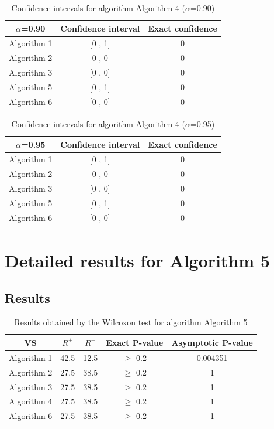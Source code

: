 \documentclass[a4paper,10pt]{article}
\begin{document}
\begin{table}[!htp]
\centering\small
\begin{tabular}{
|c|c|c|}
\hline
 $\alpha$=0.90 & Confidence interval & Exact confidence \\ \hline 
Algorithm 1 & [0 , 1] & 0\\ \hline 
Algorithm 2 & [0 , 0] & 0\\ \hline 
Algorithm 3 & [0 , 0] & 0\\ \hline 
Algorithm 5 & [0 , 1] & 0\\ \hline 
Algorithm 6 & [0 , 0] & 0\\ \hline 

\end{tabular}
\caption{Confidence intervals for algorithm Algorithm 4 ($\alpha$=0.90)}
\end{table}
\begin{table}[!htp]
\centering\small
\begin{tabular}{
|c|c|c|}
\hline
 $\alpha$=0.95 & Confidence interval & Exact confidence \\ \hline 
Algorithm 1 & [0 , 1] & 0\\ \hline 
Algorithm 2 & [0 , 0] & 0\\ \hline 
Algorithm 3 & [0 , 0] & 0\\ \hline 
Algorithm 5 & [0 , 1] & 0\\ \hline 
Algorithm 6 & [0 , 0] & 0\\ \hline 

\end{tabular}
\caption{Confidence intervals for algorithm Algorithm 4 ($\alpha$=0.95)}
\end{table}

 \clearpage 


\section{Detailed results for Algorithm 5}


\subsection{Results}

\begin{table}[!htp]
\centering\small
\begin{tabular}{
|c|c|c|c|c|}
\hline
 VS & $R^{+}$ & $R^{-}$ & Exact P-value & Asymptotic P-value \\ \hline 
Algorithm 1 & 42.5 & 12.5 & $\geq$ 0.2 & 0.004351\\ \hline 
Algorithm 2 & 27.5 & 38.5 & $\geq$ 0.2 & 1\\ \hline 
Algorithm 3 & 27.5 & 38.5 & $\geq$ 0.2 & 1\\ \hline 
Algorithm 4 & 27.5 & 38.5 & $\geq$ 0.2 & 1\\ \hline 
Algorithm 6 & 27.5 & 38.5 & $\geq$ 0.2 & 1\\ \hline 

\end{tabular}
\caption{Results obtained by the Wilcoxon test for algorithm Algorithm 5}
\end{table}
\end{document}
